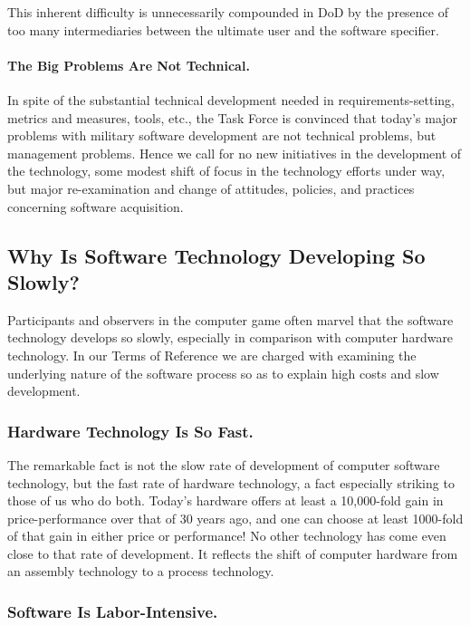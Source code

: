 \documentclass[11pt,final]{article}
\begin{document}
This inherent difficulty is unnecessarily compounded in DoD by the presence of
too many intermediaries between the ultimate user and the software specifier.

\paragraph{The Big Problems Are Not Technical.} In spite of the substantial
technical development needed in requirements-setting, metrics and measures,
tools, etc., the Task Force is convinced that today’s major problems with
military software development are not technical problems, but management
problems. Hence we call for no new initiatives in the development of the
technology, some modest shift of focus in the technology efforts under way, but
major re-examination and change of attitudes, policies, and practices
concerning software acquisition.

\subsection{Why Is Software Technology Developing So Slowly?}

Participants and observers in the computer game often marvel that the software
technology develops so slowly, especially in comparison with computer hardware
technology.  In our Terms of Reference we are charged with examining the
underlying nature of the software process so as to explain high costs and slow
development.

\subsubsection*{Hardware Technology Is So Fast.}

The remarkable fact is not the slow rate of development of computer software
technology, but the fast rate of hardware technology, a fact especially
striking to those of us who do both. Today’s hardware offers at least a
10,000-fold gain in price-performance over that of 30 years ago, and one can
choose at least 1000-fold of that gain in either price or performance! No other
technology has come even close to that rate of development. It reflects the
shift of computer hardware from an assembly technology to a process technology.

\subsubsection*{Software Is Labor-Intensive.}
\end{document}
